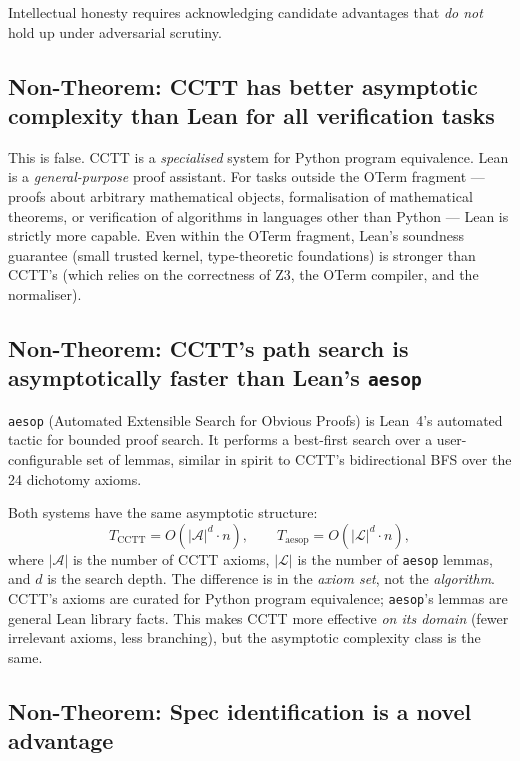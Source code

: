 Intellectual honesty requires acknowledging candidate advantages that
\emph{do not} hold up under adversarial scrutiny.

\subsection{Non-Theorem: CCTT has better asymptotic complexity than
Lean for all verification tasks}

This is false.  CCTT is a \emph{specialised} system for Python
program equivalence.  Lean is a \emph{general-purpose} proof
assistant.  For tasks outside the OTerm fragment — proofs about
arbitrary mathematical objects, formalisation of mathematical
theorems, or verification of algorithms in languages other than
Python — Lean is strictly more capable.  Even within the OTerm
fragment, Lean's soundness guarantee (small trusted kernel,
type-theoretic foundations) is stronger than CCTT's (which relies on
the correctness of Z3, the OTerm compiler, and the normaliser).

\subsection{Non-Theorem: CCTT's path search is asymptotically faster
than Lean's \texttt{aesop}}

\texttt{aesop} (Automated Extensible Search for Obvious Proofs) is
Lean~4's automated tactic for bounded proof search.  It performs a
best-first search over a user-configurable set of lemmas, similar in
spirit to CCTT's bidirectional BFS over the 24 dichotomy axioms.

Both systems have the same asymptotic structure:
\[
  T_{\mathrm{CCTT}} = O(|\mathcal{A}|^d \cdot n),
  \qquad
  T_{\mathrm{aesop}} = O(|\mathcal{L}|^d \cdot n),
\]
where $|\mathcal{A}|$ is the number of CCTT axioms, $|\mathcal{L}|$
is the number of \texttt{aesop} lemmas, and $d$ is the search depth.
The difference is in the \emph{axiom set}, not the \emph{algorithm}.
CCTT's axioms are curated for Python program equivalence; \texttt{aesop}'s
lemmas are general Lean library facts.  This makes CCTT more effective
\emph{on its domain} (fewer irrelevant axioms, less branching), but
the asymptotic complexity class is the same.

\subsection{Non-Theorem: Spec identification is a novel advantage}

